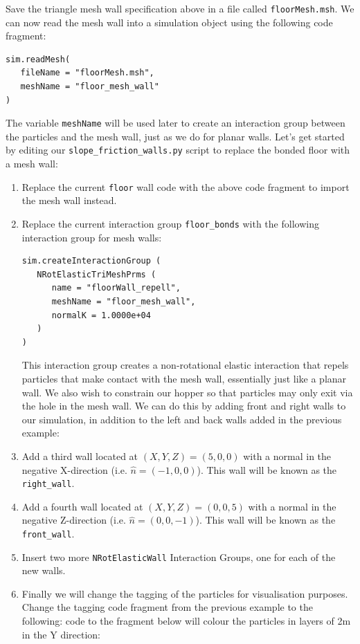 Save the triangle mesh wall specification above in a file called \texttt{floorMesh.msh}. We can now read the mesh wall into a simulation object using the following code fragment:

\begin{verbatim}
sim.readMesh(
   fileName = "floorMesh.msh",
   meshName = "floor_mesh_wall"
)
\end{verbatim}

The variable \texttt{meshName} will be used later to create an interaction group between the particles and the mesh wall, just as we do for planar walls. Let's get started by editing our \texttt{slope\_friction\_walls.py} script to replace the bonded floor with a mesh wall:

\begin{enumerate}
\item Replace the current \texttt{floor} wall code with the above code fragment to import the mesh wall instead.
\item Replace the current interaction group \texttt{floor\_bonds} with the following interaction group for mesh walls:

\begin{verbatim}
sim.createInteractionGroup (
   NRotElasticTriMeshPrms (
      name = "floorWall_repell",
      meshName = "floor_mesh_wall",
      normalK = 1.0000e+04
   )
)
\end{verbatim}

This interaction group creates a non-rotational elastic interaction that repels  particles that make contact with the mesh wall, essentially just like a planar wall. We also wish to constrain our hopper so that particles may only exit via the hole in the mesh wall. We can do this by adding front and right walls to our simulation, in addition to the left and back walls added in the previous example:
\item Add a third wall located at $(X,Y,Z) = (5,0,0)$ with a normal in the negative X-direction (i.e. $\hat{n} = (-1,0,0)$). This wall will be known as the \texttt{right\_wall}.
\item Add a fourth wall located at $(X,Y,Z) = (0,0,5)$ with a normal in the negative Z-direction (i.e. $\hat{n} = (0,0,-1)$). This wall will be known as the \texttt{front\_wall}.
\item Insert two more \texttt{NRotElasticWall} Interaction Groups, one for each of the new walls.
\item Finally we will change the tagging of the particles for visualisation purposes. Change the tagging code fragment from the previous example to the following: code to the fragment below will colour the particles in layers of 2m in the Y direction:


\end{enumerate}
